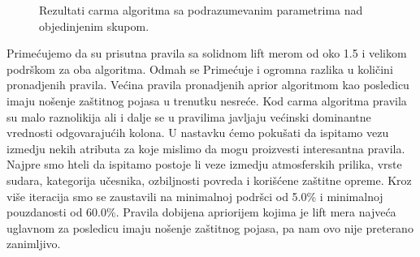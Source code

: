 \documentclass[a4paper,10pt]{article}
\begin{document}
\begin{figure}[h!]
 \centering
 \caption{Rezultati carma algoritma sa podrazumevanim parametrima nad objedinjenim skupom.}
\end{figure}

\clearpage

Primećujemo da su prisutna pravila sa solidnom lift merom od oko 1.5 i velikom podrškom za oba algoritma. Odmah se Primećuje
i ogromna razlika u količini pronadjenih pravila. Većina pravila pronadjenih aprior algoritmom kao posledicu imaju nošenje
zaštitnog pojasa u trenutku nesreće. Kod carma algoritma pravila su malo raznolikija ali i dalje se u pravilima javljaju 
većinski dominantne vrednosti odgovarajućih kolona. U nastavku ćemo pokušati da ispitamo vezu izmedju nekih atributa za koje
mislimo da mogu proizvesti interesantna pravila. \\

Najpre smo hteli da ispitamo postoje li veze izmedju atmosferskih prilika, vrste sudara, kategorija učesnika, ozbiljnosti povreda
i korišćene zaštitne opreme. Kroz više iteracija smo se zaustavili na minimalnoj podršci od 5.0\% i minimalnoj pouzdanosti od 60.0\%.
Pravila dobijena apriorijem kojima je lift mera najveća uglavnom za posledicu imaju nošenje zaštitnog pojasa, pa nam ovo nije 
preterano zanimljivo. 
\end{document}
